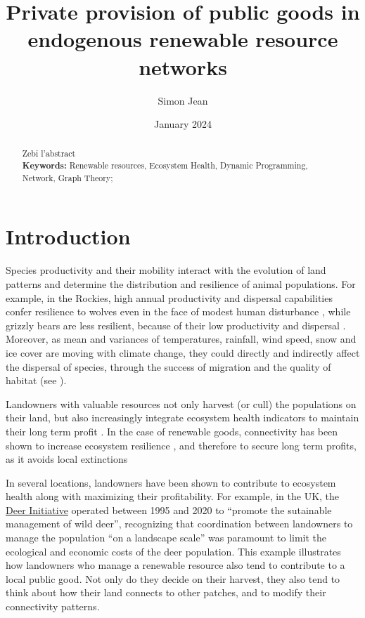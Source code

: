 \documentclass{article}
\title{Private provision of public goods in endogenous renewable resource networks}
\author{Simon Jean}
\date{January 2024}
\begin{document}
\onehalfspacing
\maketitle
\begin{abstract}
Zebi l'abstract
\\
\textbf{Keywords: } Renewable resources, Ecosystem Health, Dynamic Programming, Network, Graph Theory;
\end{abstract}


\section{Introduction}

Species productivity and their mobility interact with the evolution of land patterns and determine the distribution and resilience of animal populations. For example, in the Rockies, high annual productivity and dispersal capabilities confer resilience to wolves even in the face of modest human disturbance , while grizzly bears are less resilient, because of their low productivity and dispersal \citep{weaver_resilience_1996}. Moreover, as mean and variances of temperatures, rainfall, wind speed, snow and ice cover are moving with climate change, they could directly and indirectly affect the dispersal of species, through the success of migration and the quality of habitat (see \cite{travis_dispersal_2013}). 

Landowners with valuable resources not only harvest (or cull) the populations on their land, but also increasingly integrate ecosystem health indicators to maintain their long term profit \citep{loreau_biodiversity_2003, baumgartner_economic_2014} . In the case of renewable goods, connectivity has been shown to increase ecosystem resilience \citep{shackelford_role_2018}, and therefore to secure long term profits, as it avoids local extinctions \citep{iucn_iucn_nodate, newbold_global_2014}


 In several locations, landowners have been shown to contribute to ecosystem health along with maximizing their profitability. For example, in the UK, the \href{https://www.nationalgamekeepers.org.uk/articles/deer-initiative-announcement}{Deer Initiative} operated between 1995 and 2020 to \enquote{promote the sutainable management of wild deer}, recognizing that coordination between landowners to manage the population \enquote{on a landscape scale} was paramount to limit the ecological and economic costs of the deer population. This example illustrates how landowners who manage a renewable resource also tend to contribute to a local public good. Not only do they decide on their harvest, they also tend to think about how their land connects to other patches, and to modify their connectivity patterns. 
\end{document}
